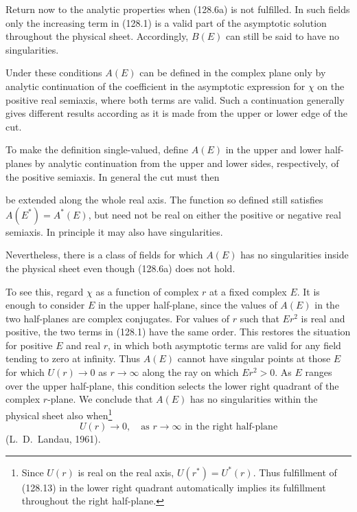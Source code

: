 Return now to the analytic properties when (128.6a) is not fulfilled. In such
fields only the increasing term in (128.1) is a valid part of the asymptotic
solution throughout the physical sheet. Accordingly, $B(E)$ can still be said
to have no singularities.

Under these conditions $A(E)$ can be defined in the complex plane only by
analytic continuation of the coefficient in the asymptotic expression for
$\chi$ on the positive real semiaxis, where both terms are valid. Such a
continuation generally gives different results according as it is made from
the upper or lower edge of the cut.

To make the definition single-valued, define $A(E)$ in the upper and lower
half-planes by analytic continuation from the upper and lower sides,
respectively, of the positive semiaxis. In general the cut must then

be extended along the whole real axis. The function so defined still satisfies
$A(E^*)=A^*(E)$, but need not be real on either the positive or negative real
semiaxis. In principle it may also have singularities.

Nevertheless, there is a class of fields for which $A(E)$ has no singularities
inside the physical sheet even though (128.6a) does not hold.

To see this, regard $\chi$ as a function of complex $r$ at a fixed complex
$E$. It is enough to consider $E$ in the upper half-plane, since the values of
$A(E)$ in the two half-planes are complex conjugates. For values of $r$ such
that $Er^2$ is real and positive, the two terms in (128.1) have the same order.
This restores the situation for positive $E$ and real $r$, in which both
asymptotic terms are valid for any field tending to zero at infinity. Thus
$A(E)$ cannot have singular points at those $E$ for which $U(r)\to0$ as
$r\to\infty$ along the ray on which $Er^2>0$. As $E$ ranges over the upper
half-plane, this condition selects the lower right quadrant of the complex
$r$-plane. We conclude that $A(E)$ has no singularities within the physical
sheet also when\footnote{Since $U(r)$ is real on the real axis,
$U(r^*)=U^*(r)$. Thus fulfillment of (128.13) in the lower right quadrant
automatically implies its fulfillment throughout the right half-plane.}
\begin{equation}
 U(r)\to0,\quad\text{as }r\to\infty\text{ in the right half-plane}
 \tag{128.13}
\end{equation}
(L.~D.~Landau, 1961).

